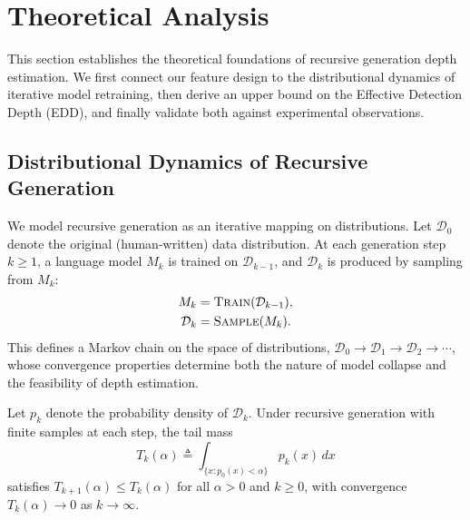 
\section{Theoretical Analysis}
\label{sec:theory}

This section establishes the theoretical foundations of recursive generation depth estimation. We first connect our feature design to the distributional dynamics of iterative model retraining, then derive an upper bound on the Effective Detection Depth (EDD), and finally validate both against experimental observations.

\subsection{Distributional Dynamics of Recursive Generation}
\label{sec:theory:dynamics}

We model recursive generation as an iterative mapping on distributions. Let $\mathcal{D}_0$ denote the original (human-written) data distribution. At each generation step $k \geq 1$, a language model $M_k$ is trained on $\mathcal{D}_{k-1}$, and $\mathcal{D}_k$ is produced by sampling from $M_k$:
\begin{align}
    M_k &= \textsc{Train}(\mathcal{D}_{k-1}), \label{eq:train} \\
    \mathcal{D}_k &= \textsc{Sample}(M_k). \label{eq:sample}
\end{align}
This defines a Markov chain on the space of distributions, $\mathcal{D}_0 \to \mathcal{D}_1 \to \mathcal{D}_2 \to \cdots$, whose convergence properties determine both the nature of model collapse and the feasibility of depth estimation.

\begin{theorem}
\label{thm:tail}
Let $p_k$ denote the probability density of $\mathcal{D}_k$. Under recursive generation with finite samples at each step, the tail mass
\begin{equation}
    T_k(\alpha) \triangleq \int_{\{x : p_0(x) < \alpha\}} p_k(x) \, dx
\end{equation}
satisfies $T_{k+1}(\alpha) \leq T_k(\alpha)$ for all $\alpha > 0$ and $k \geq 0$, with convergence $T_k(\alpha) \to 0$ as $k \to \infty$.
\end{theorem}

